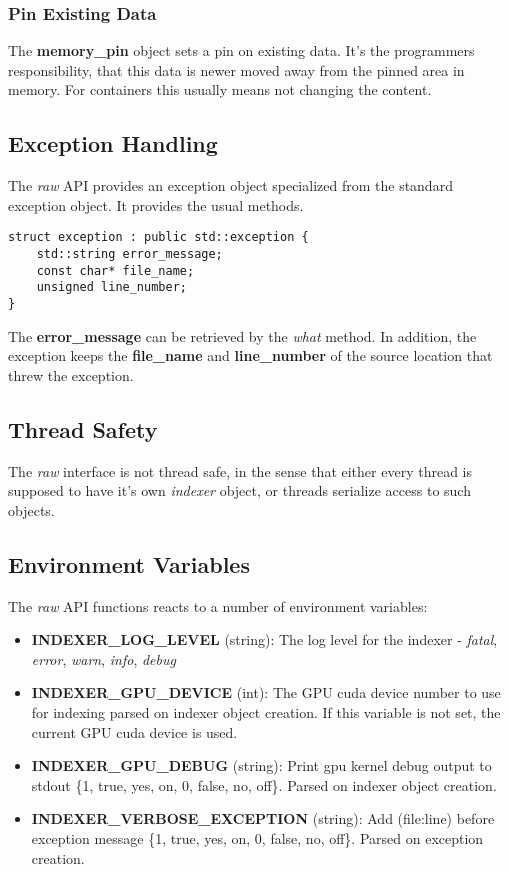 \documentclass[a4paper,10pt]{article}
\begin{document}
\subsubsection{Pin Existing Data}

The \textbf{memory\_pin} object sets a pin on existing data. It's the programmers responsibility, that this data is newer moved away from the pinned area in memory. For containers this usually means not changing the content.

\subsection{Exception Handling}

The \emph{raw} API provides an exception object specialized from the standard exception object. It provides the usual methods.
%
\begin{lstlisting}
struct exception : public std::exception {
    std::string error_message;
    const char* file_name;
    unsigned line_number;
}
\end{lstlisting}
%
The \textbf{error\_message} can be retrieved by the \emph{what} method. In addition, the exception keeps the \textbf{file\_name} and \textbf{line\_number} of the source location that threw the exception.

\subsection{Thread Safety}

The \emph{raw} interface is not thread safe, in the sense that either every thread is supposed to have it's own \emph{indexer} object, or threads serialize access to such objects.

\subsection{Environment Variables}

The \emph{raw} API functions reacts to a number of environment variables:
%
\begin{itemize}
 \item \textbf{INDEXER\_LOG\_LEVEL} (string): The log level for the indexer - \emph{fatal}, \emph{error}, \emph{warn}, \emph{info}, \emph{debug}
 \item \textbf{INDEXER\_GPU\_DEVICE} (int): The GPU cuda device number to use for indexing parsed on indexer object creation. If this variable is not set, the current GPU cuda device is used.
 \item \textbf{INDEXER\_GPU\_DEBUG} (string): Print gpu kernel debug output to stdout \{1, true, yes, on, 0, false, no, off\}. Parsed on indexer object creation.
 \item \textbf{INDEXER\_VERBOSE\_EXCEPTION} (string): Add (file:line) before exception message \{1, true, yes, on, 0, false, no, off\}. Parsed on exception creation.
\end{itemize}
\end{document}
